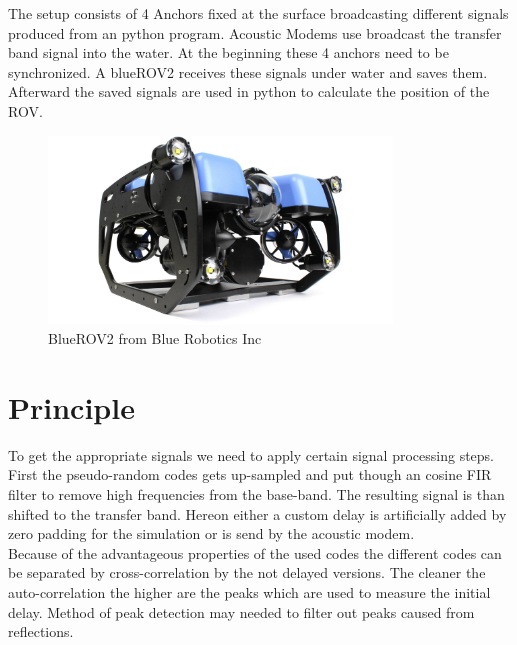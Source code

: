 The setup consists of 4 Anchors fixed at the surface broadcasting different signals produced from an python program. Acoustic Modems use broadcast the transfer band signal into the water. At the beginning these 4 anchors need to be synchronized. A blueROV2 receives these signals under water and saves them. Afterward the saved signals are used in python to calculate the position of the ROV.
\begin{figure}[h]
	\includegraphics[height=5cm]{images/bluerov}
	
	\caption{BlueROV2 from Blue Robotics Inc}
	\label{fig:bode}
\end{figure}

\section{Principle}

To get the appropriate signals we need to apply certain signal processing steps. First the pseudo-random codes gets up-sampled and put though an cosine FIR filter to remove high frequencies from the base-band. The resulting signal is than shifted to the transfer band. Hereon either a custom delay is artificially added by zero padding for the simulation or is send by the acoustic modem. \\
Because of the advantageous properties of the used codes the different codes can be separated by cross-correlation by the not delayed versions. The cleaner the auto-correlation the higher are the peaks which are used to measure the initial delay. Method of peak detection may needed to filter out peaks caused from reflections.\\
